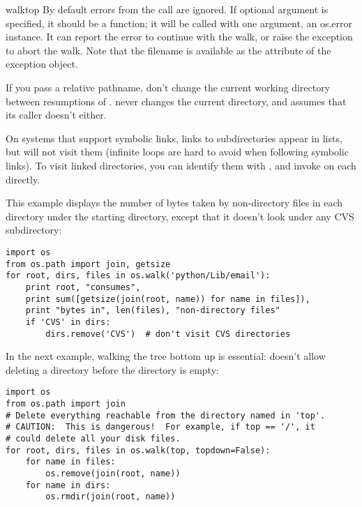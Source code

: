 \begin{funcdesc}{walk}{top}
By default errors from the  call are ignored.  If
optional argument  is specified, it should be a function;
it will be called with one argument, an os.error instance.  It can
report the error to continue with the walk, or raise the exception
to abort the walk.  Note that the filename is available as the
 attribute of the exception object.

\begin{notice}
If you pass a relative pathname, don't change the current working
directory between resumptions of .  
never changes the current directory, and assumes that its caller
doesn't either.
\end{notice}

\begin{notice}
On systems that support symbolic links, links to subdirectories appear
in  lists, but  will not visit them
(infinite loops are hard to avoid when following symbolic links).
To visit linked directories, you can identify them with
, and invoke 
on each directly.
\end{notice}

This example displays the number of bytes taken by non-directory files
in each directory under the starting directory, except that it doesn't
look under any CVS subdirectory:

\begin{verbatim}
import os
from os.path import join, getsize
for root, dirs, files in os.walk('python/Lib/email'):
    print root, "consumes",
    print sum([getsize(join(root, name)) for name in files]),
    print "bytes in", len(files), "non-directory files"
    if 'CVS' in dirs:
        dirs.remove('CVS')  # don't visit CVS directories
\end{verbatim}

In the next example, walking the tree bottom up is essential:
 doesn't allow deleting a directory before the
directory is empty:

\begin{verbatim}
import os
from os.path import join
# Delete everything reachable from the directory named in 'top'.
# CAUTION:  This is dangerous!  For example, if top == '/', it
# could delete all your disk files.
for root, dirs, files in os.walk(top, topdown=False):
    for name in files:
        os.remove(join(root, name))
    for name in dirs:
        os.rmdir(join(root, name))
\end{verbatim}

\end{funcdesc}

